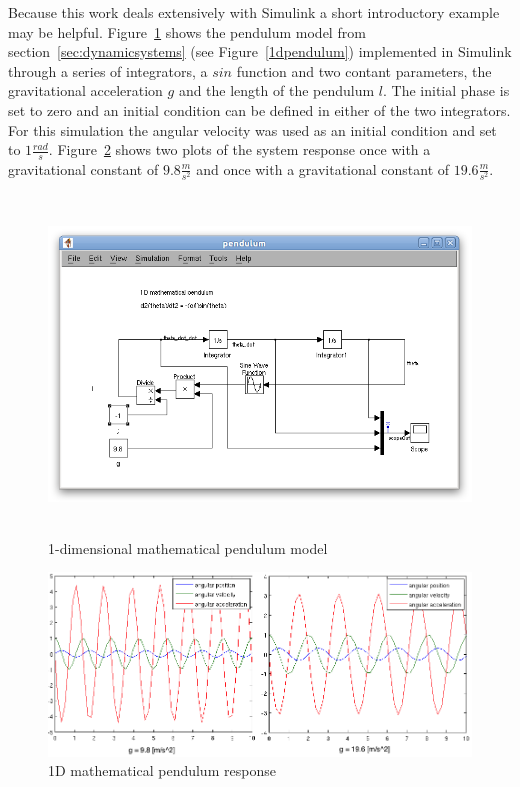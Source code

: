 Because this work deals extensively with Simulink a short introductory example may be helpful. Figure~\ref{pendumodelscreen} shows the pendulum model from section~\ref{sec:dynamicsystems} (see Figure~\ref{1dpendulum}) implemented in Simulink through a series of integrators, a $sin$ function and two contant parameters, the gravitational acceleration $g$ and the length of the pendulum $l$. The initial phase is set to zero and an initial condition can be defined in either of the two integrators. For this simulation the angular velocity was used as an initial condition and set to $1\frac{rad}{s}$. Figure~\ref{penduresponse} shows two plots of the system response once with a gravitational constant of $9.8\frac{m}{s^2}$ and once with a gravitational constant of $19.6\frac{m}{s^2}$.

\begin{figure}[pendumodelscreen]
\begin{center}
\includegraphics[height=9cm]{media/pendmodelscreen.png}
\caption{1-dimensional mathematical pendulum model}
\label{pendumodelscreen}
\end{center}
\end{figure}


\begin{figure}[penduresponse]
\begin{center}
\includegraphics[width=15cm]{media/pendulum_response.png}
\caption{1D mathematical pendulum response}
\label{penduresponse}
\end{center}
\end{figure}


